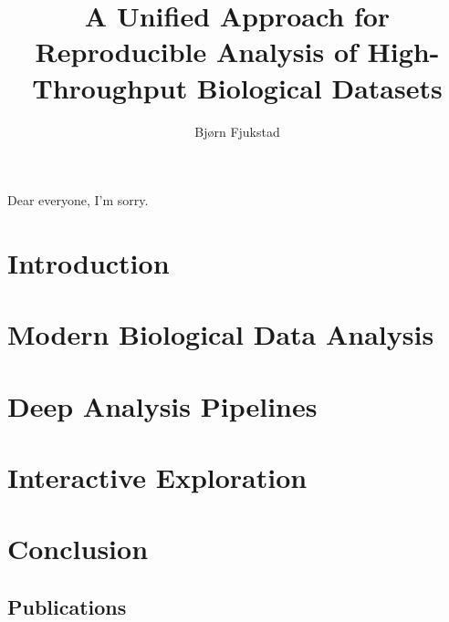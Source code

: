 \documentclass[USenglish,phd]{uit-thesis}
\begin{document}
 

\title{A Unified Approach for Reproducible Analysis of High-Throughput
Biological Datasets}
\author{Bjørn Fjukstad}
\maketitle

\begin{dedication}
    Dear everyone, I'm sorry.
\end{dedication}

\frontmatter
 
 

\tableofcontents
\mainmatter

\chapter{Introduction}
 

\chapter{Modern Biological Data Analysis}


\chapter{Deep Analysis Pipelines}  


\chapter{Interactive Exploration}  


\chapter{Conclusion}
 

\appendix
\begin{appendix}
    \chapter{Publications}
\end{appendix}

\backmatter



\end{document}
